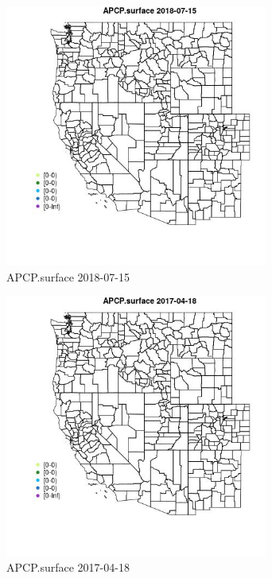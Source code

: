 \begin{figure} 
\centering  
\includegraphics[width=0.77\textwidth]{Code_Outputs/Report_ML_input_PM25_Step4_part_e_de_duplicated_aveswNAs_MapObsAPCPsurface2018-07-15.jpg} 
\caption{\label{fig:Report_ML_input_PM25_Step4_part_e_de_duplicated_aveswNAsMapObsAPCPsurface2018-07-15}APCP.surface 2018-07-15} 
\end{figure} 
 

\begin{figure} 
\centering  
\includegraphics[width=0.77\textwidth]{Code_Outputs/Report_ML_input_PM25_Step4_part_e_de_duplicated_aveswNAs_MapObsAPCPsurface2017-04-18.jpg} 
\caption{\label{fig:Report_ML_input_PM25_Step4_part_e_de_duplicated_aveswNAsMapObsAPCPsurface2017-04-18}APCP.surface 2017-04-18} 
\end{figure} 
 

